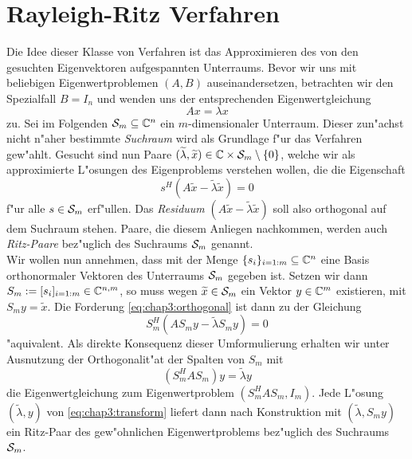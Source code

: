 \section{Rayleigh-Ritz Verfahren}\label{sec:ritz}
Die Idee dieser Klasse von Verfahren ist das Approximieren des von
den gesuchten Eigenvektoren aufgespannten Unterraums.
Bevor wir uns mit beliebigen Eigenwertproblemen $(A,B)$ auseinandersetzen, betrachten wir den Spezialfall $B=I_n$ und wenden uns der entsprechenden Eigenwertgleichung
\[
Ax = \lambda x
\]
zu. Sei im Folgenden $\S_m\subseteq\Cn$ ein $m$-dimensionaler Unterraum. Dieser zun"achst nicht
n"aher bestimmte \emph{Suchraum} wird als Grundlage f"ur das Verfahren gew"ahlt.
Gesucht sind nun Paare $(\widetilde{\lambda}, \widetilde{x})\in\C\times \S_m \setminus\{0\}$,
welche wir als approximierte L"osungen des Eigenproblems verstehen wollen, die
die Eigenschaft
\begin{equation}\label{eq:chap3:orthogonal}
s^H(A\widetilde{x} - \widetilde{\lambda}\widetilde{x})=0
\end{equation}
f"ur alle $s \in \S_m $ erf"ullen. Das \emph{Residuum} $(A\widetilde{x} - \widetilde{\lambda}\widetilde{x})$
soll also orthogonal auf dem Suchraum stehen. Paare, die diesem Anliegen nachkommen,
werden auch \emph{Ritz-Paare} bez"uglich des Suchraums $\S_m$ genannt.\\

Wir wollen nun annehmen, dass mit der Menge $\{s_i\}_{i=1:m}\subseteq \Cn$ eine Basis orthonormaler Vektoren des Unterraums $\S_m$ gegeben ist. Setzen wir dann $S_m :=[s_i]_{i=1:m}\in\C^{n,m}$, so muss wegen $\widetilde{x}\in\S_m$
ein Vektor $y\in\C^m$ existieren, mit $S_m y = \widetilde{x}$. Die Forderung \eqref{eq:chap3:orthogonal}
ist dann zu der Gleichung
\[
S_m^H(AS_m y - \widetilde{\lambda} S_m y) = 0
\]
"aquivalent. Als direkte Konsequenz dieser Umformulierung erhalten wir unter Ausnutzung
der Orthogonalit"at der Spalten von $S_m$ mit
\begin{equation}\label{eq:chap3:transform}
(S_m^H A S_m) y = \widetilde{\lambda}y
\end{equation}
die Eigenwertgleichung zum Eigenwertproblem $(S_m^H A S_m, I_m)$. Jede L"osung $(\widetilde{\lambda},y)$ von \eqref{eq:chap3:transform}
liefert dann nach Konstruktion mit $(\widetilde{\lambda}, S_m y)$ ein Ritz-Paar des gew"ohnlichen
Eigenwertproblems bez"uglich des Suchraums $\S_m$.\\

